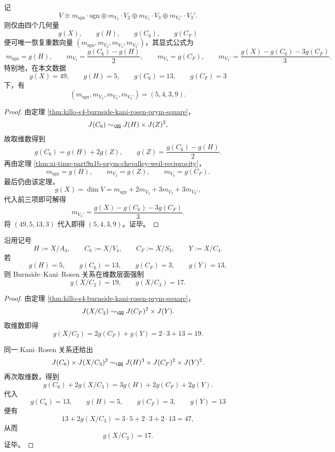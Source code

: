 \begin{corollary}\label{cor:xi-time-part9n1b-four-genera-recover-hodge-vector}
记
\[
V\cong
m_{\mathrm{sgn}}\cdot \mathrm{sgn}\oplus
m_{V_2}\cdot V_2\oplus
m_{V_3}\cdot V_3\oplus
m_{V_3'}\cdot V_3'.
\]
则仅由四个几何量
\[
g(X),\qquad g(H),\qquad g(C_6),\qquad g(C_F)
\]
便可唯一恢复重数向量 \((m_{\mathrm{sgn}},m_{V_2},m_{V_3},m_{V_3'})\)，其显式公式为
\[
\boxed{\;
m_{\mathrm{sgn}}=g(H),\qquad
m_{V_2}=\frac{g(C_6)-g(H)}{2},\qquad
m_{V_3}=g(C_F),\qquad
m_{V_3'}=\frac{g(X)-g(C_6)-3g(C_F)}{3}. \;}
\]
特别地，在本文数据
\[
g(X)=49,\qquad g(H)=5,\qquad g(C_6)=13,\qquad g(C_F)=3
\]
下，有
\[
(m_{\mathrm{sgn}},m_{V_2},m_{V_3},m_{V_3'})=(5,4,3,9).
\]
\end{corollary}
\begin{proof}
由定理 \ref{thm:killo-s4-burnside-kani-rosen-prym-square}，
\[
J(C_6)\sim_{\QQ}J(H)\times J(Z)^2,
\]
故取维数得到
\[
g(C_6)=g(H)+2g(Z),
\qquad
g(Z)=\frac{g(C_6)-g(H)}{2}.
\]
再由定理 \ref{thm:xi-time-part9n1b-prym-chevalley-weil-reciprocity}，
\[
m_{\mathrm{sgn}}=g(H),\qquad
m_{V_2}=g(Z),\qquad
m_{V_3}=g(C_F).
\]
最后仍由该定理，
\[
g(X)=\dim V=m_{\mathrm{sgn}}+2m_{V_2}+3m_{V_3}+3m_{V_3'},
\]
代入前三项即可解得
\[
m_{V_3'}=\frac{g(X)-g(C_6)-3g(C_F)}{3}.
\]
将 \((49,5,13,3)\) 代入即得 \((5,4,3,9)\)。证毕。
\end{proof}

\begin{theorem}\label{thm:xi-time-part9n1b-kani-rosen-hidden-quotient-genera}
沿用记号
\[
H:=X/A_4,\qquad C_6:=X/V_4,\qquad C_F:=X/S_3,\qquad Y:=X/C_4.
\]
若
\[
g(H)=5,\qquad g(C_6)=13,\qquad g(C_F)=3,\qquad g(Y)=13,
\]
则 Burnside--Kani--Rosen 关系在维数层面强制
\[
\boxed{\;
g(X/C_2)=19,\qquad g(X/C_3)=17.\;}
\]
\end{theorem}
\begin{proof}
由定理 \ref{thm:killo-s4-burnside-kani-rosen-prym-square}，
\[
J(X/C_2)\sim_{\QQ}J(C_F)^2\times J(Y).
\]
取维数即得
\[
g(X/C_2)=2g(C_F)+g(Y)=2\cdot 3+13=19.
\]

同一 Kani--Rosen 关系还给出
\[
J(C_6)\times J(X/C_3)^2\sim_{\QQ}J(H)^3\times J(C_F)^2\times J(Y)^2.
\]
再次取维数，得到
\[
g(C_6)+2g(X/C_3)=3g(H)+2g(C_F)+2g(Y).
\]
代入
\[
g(C_6)=13,\qquad g(H)=5,\qquad g(C_F)=3,\qquad g(Y)=13
\]
便有
\[
13+2g(X/C_3)=3\cdot 5+2\cdot 3+2\cdot 13=47,
\]
从而
\[
g(X/C_3)=17.
\]
证毕。
\end{proof}

